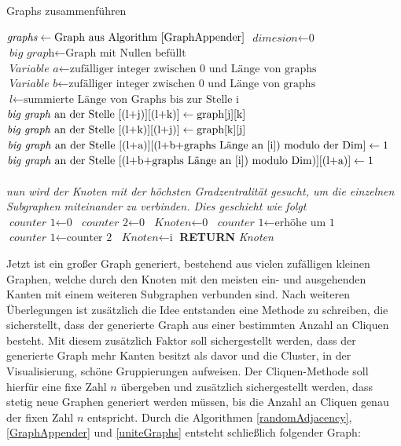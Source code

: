 \begin{algorithm}
\caption{Graphs zusammenführen}\label{uniteGraphs}
\begin{algorithmic}[1]
\State $\textit{graphs} \gets \text{Graph aus Algorithm \ref{GraphAppender}}$
\State {}
\EndIf
\State $\textit{dimesion} \gets \text{0}$
\State $\textit{big graph} \gets \text{Graph mit Nullen befüllt}$
\State $\textit{Variable a} \gets \text{zufälliger integer zwischen 0 und Länge von graphs}$
\State $\textit{Variable b} \gets \text{zufälliger integer zwischen 0 und Länge von graphs}$
\State $\textit{l} \gets \text{summierte Länge von Graphs bis zur Stelle i}$
\State $\text{\textit{big graph} an der Stelle [(l+j)][(l+k)]} \gets \text{graph[j][k]}$
\State $\text{\textit{big graph} an der Stelle [(l+k)][(l+j)]} \gets \text{graph[k][j]}$
\State $\text{\textit{big graph} an der Stelle [(l+a)][(l+b+graphs Länge an [i]) modulo der Dim]} \gets \text{1}$
\State $\text{\textit{big graph} an der Stelle [(l+b+graphs Länge an [i]) modulo Dim)][(l+a)]} \gets \text{1}$
\EndFor
\EndFor
\\
\\
\textit{nun wird der Knoten mit der höchsten Gradzentralität gesucht, um die einzelnen}
\textit{Subgraphen miteinander zu verbinden. Dies geschieht wie folgt}\\
\State $\textit{counter 1} \gets \text{0}$
\State $\textit{counter 2} \gets \text{0}$
\State $\textit{Knoten} \gets \text{0}$
\State $\textit{counter 1} \gets \text{erhöhe um 1}$
\State $\textit{counter 1} \gets \text{counter 2}$
\State $\textit{Knoten} \gets \text{i}$
\EndIf
\EndIf
\EndFor
\textbf{RETURN} \textit{Knoten}
\EndProcedure
\end{algorithmic}
\end{algorithm}

Jetzt ist ein großer Graph generiert, bestehend aus vielen zufälligen kleinen Graphen, welche durch den Knoten mit den meisten ein- und ausgehenden Kanten mit einem weiteren Subgraphen verbunden sind.
Nach weiteren Überlegungen ist zusätzlich die Idee entstanden eine Methode zu schreiben, die sicherstellt, dass der generierte Graph aus einer bestimmten Anzahl an Cliquen besteht. Mit diesem zusätzlich Faktor soll sichergestellt werden, dass der generierte Graph mehr Kanten besitzt als davor und die Cluster, in der Visualisierung, schöne Gruppierungen aufweisen. Der Cliquen-Methode soll hierfür eine fixe Zahl $n$ übergeben und zusätzlich sichergestellt werden, dass stetig neue Graphen generiert werden müssen, bis die Anzahl an Cliquen genau der fixen Zahl $n$ entspricht.
Durch die Algorithmen \ref{randomAdjacency}, \ref{GraphAppender} und \ref{uniteGraphs} entsteht schließlich folgender Graph:

